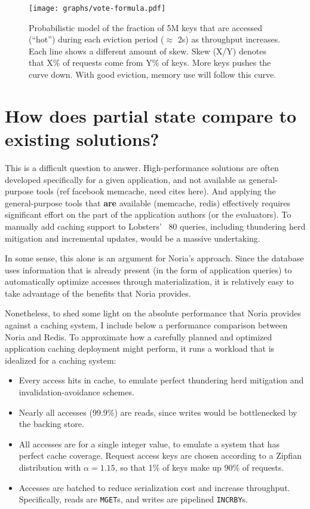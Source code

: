 \begin{figure}[h]
  \centering
  \texttt{[image: graphs/vote-formula.pdf]}
  \caption{Probabilistic model of the fraction of 5M keys that are accessed
  (``hot'') during each eviction period ($\approx$ 2s) as throughput increases.
  Each line shows a different amount of skew. Skew (X/Y) denotes that X\% of
  requests come from Y\% of keys. More keys pushes the curve down. With good
  eviction, memory use will follow this curve.}
  \label{f:vote-formula}
\end{figure}

\section{How does partial state compare to existing solutions?}
\label{s:eval:existing}

This is a difficult question to answer. High-performance solutions are
often developed specifically for a given application, and not available
as general-purpose tools (ref facebook memcache, need cites here).
And applying the general-purpose tools that \textbf{are} available (memcache,
redis) effectively requires significant effort on the part of the application
authors (or the evaluators). To manually add caching support to Lobsters' ~80
queries, including thundering herd mitigation and incremental updates, would be
a massive undertaking.

In some sense, this alone is an argument for Noria's approach. Since the
database uses information that is already present (in the form of application
queries) to automatically optimize accesses through materialization, it is
relatively easy to take advantage of the benefits that Noria provides.

Nonetheless, to shed some light on the absolute performance that Noria provides
against a caching system, I include below a performance comparison between Noria
and Redis. To approximate how a carefully planned and optimized application
caching deployment might perform, it runs a workload that is idealized for a
caching system:

\begin{itemize}
 \item Every access hits in cache, to emulate perfect thundering herd mitigation
   and invalidation-avoidance schemes.
 \item Nearly all accesses (99.9\%) are reads, since writes would be
   bottlenecked by the backing store.
 \item All accesses are for a single integer value, to emulate a system that has
   perfect cache coverage. Request access keys are chosen according to a Zipfian
    distribution with $\alpha = 1.15$, so that 1\% of keys make up 90\% of
    requests.
 \item Accesses are batched to reduce serialization cost and increase
   throughput. Specifically, reads are \texttt{MGET}s, and writes are pipelined
    \texttt{INCRBY}s.
\end{itemize}

